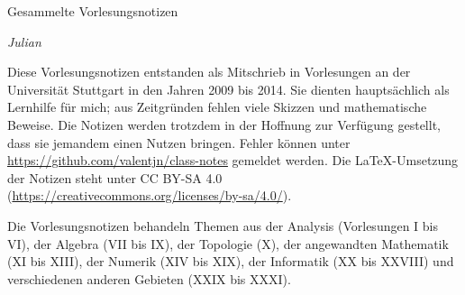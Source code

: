 
\ihead{\leftmark}
\ifoot{\vspace{-1.5mm}\rightmark}

\thispagestyle{empty}
\vspace*{1em}

{%
  \huge%
  Gesammelte Vorlesungsnotizen%
}
\vspace*{1em}

\emph{Julian }

\vspace*{1em}

Diese Vorlesungsnotizen entstanden als Mitschrieb in Vorlesungen
an der Universität Stuttgart in den Jahren 2009 bis 2014.
Sie dienten hauptsächlich als Lernhilfe für mich;
aus Zeitgründen fehlen viele Skizzen und mathematische Beweise.
Die Notizen werden trotzdem in der Hoffnung zur Verfügung gestellt,
dass sie jemandem einen Nutzen bringen.
Fehler können unter \url{https://github.com/valentjn/class-notes} gemeldet werden.
Die \LaTeX{}-Umsetzung der Notizen steht unter CC BY-SA 4.0
(\url{https://creativecommons.org/licenses/by-sa/4.0/}).

Die Vorlesungsnotizen behandeln Themen aus
der Analysis (Vorlesungen I bis VI),
der Algebra (VII bis IX),
der Topologie (X),
der angewandten Mathematik (XI bis XIII),
der Numerik (XIV bis XIX),
der Informatik (XX bis XXVIII) und
verschiedenen anderen Gebieten (XXIX bis XXXI).

{%
  \setcounter{tocdepth}{\parttocdepth}


  \makeatletter
  \renewcommand*{\@pnumwidth}{2.7em}
  \renewcommand*{\@tocrmarg}{2.7em}
  \makeatother

  \renewcommand*{\contentsname}{Vorlesungen}
  \tableofcontents%
}

\pagebreak

{%

  \setcounter{tocdepth}{\subsubsectiontocdepth}

  \tableofcontents%
}

\pagebreak



